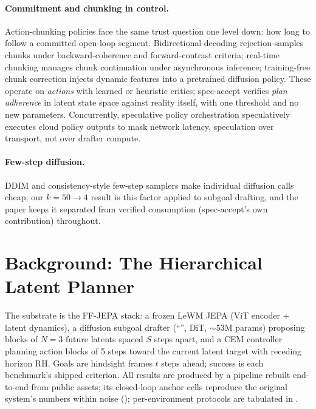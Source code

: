 \documentclass{article}
\newcommand{\gdm}{\text{GDM}}
\begin{document}
\paragraph{Commitment and chunking in control.} Action-chunking policies face the
same trust question one level down: how long to follow a committed open-loop segment.
Bidirectional decoding \citep{bid} rejection-samples chunks under backward-coherence
and forward-contrast criteria; real-time chunking \citep{rtc} manages chunk
continuation under asynchronous inference; training-free chunk correction
\citep{dcdp} injects dynamic features into a pretrained diffusion policy. These
operate on \emph{actions} with learned or heuristic critics; spec-accept verifies
\emph{plan adherence} in latent state space against reality itself, with one
threshold and no new parameters. Concurrently, speculative policy orchestration
\citep{spo} speculatively executes cloud policy outputs to mask network latency, speculation over transport, not over drafter compute.

\paragraph{Few-step diffusion.} DDIM \citep{ddim} and consistency-style few-step
samplers \citep{consistency} make individual diffusion calls cheap; our $k{=}50\to4$
result is this factor applied to subgoal drafting, and the paper keeps it separated
from verified consumption (spec-accept's own contribution) throughout.


\section{Background: The Hierarchical Latent Planner}
\label{sec:setup}
The substrate is the FF-JEPA stack: a frozen LeWM JEPA (ViT encoder + latent
dynamics), a diffusion subgoal drafter (``\gdm{}'', DiT, ${\sim}53$M params) proposing
blocks of $N{=}3$ future latents spaced $S$ steps apart, and a CEM controller planning
action blocks of 5 steps toward the current latent target with receding horizon RH.
Goals are hindsight frames $t$ steps ahead; success is each benchmark's shipped
criterion. All results are produced by a pipeline rebuilt end-to-end from public
assets; its closed-loop anchor cells reproduce the original system's numbers within
noise (); per-environment protocols are tabulated in
.
\end{document}

